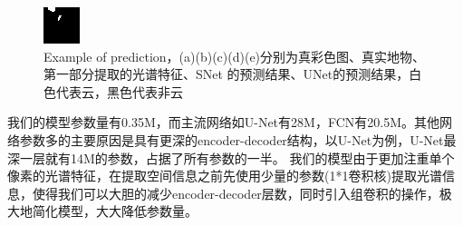 \documentclass[UTF8]{ctexart}
\begin{document}
\begin{figure}[H]
{\begin{minipage}[b]{0.15\linewidth}
            \includegraphics[width=1\linewidth]{../log/spoon2/cut/tmp_cut_LC80980712014024LGN00_15443_unet.jpg}\vspace{4pt}
        \end{minipage}
    }
\caption{Example of prediction，(a)(b)(c)(d)(e)分别为真彩色图、真实地物、第一部分提取的光谱特征、SNet
的预测结果、UNet的预测结果，白色代表云，黑色代表非云}
\label{Fig.main1}
\end{figure}

我们的模型参数量有0.35M，而主流网络如U-Net有28M，FCN有20.5M。其他网络参数多的主要原因是具有更深的encoder-decoder结构，以U-Net为例，U-Net最深一层就有14M的参数，占据了所有参数的一半。
我们的模型由于更加注重单个像素的光谱特征，在提取空间信息之前先使用少量的参数(1*1卷积核)提取光谱信息，使得我们可以大胆的减少encoder-decoder层数，同时引入组卷积的操作，极大地简化模型，大大降低参数量。
\end{document}
